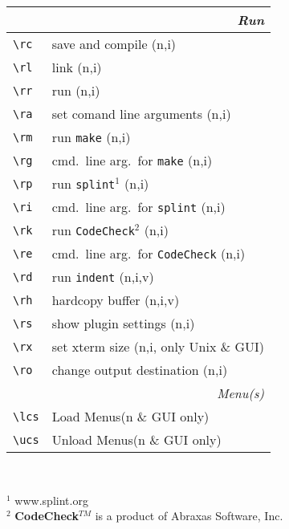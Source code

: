 \documentclass[oneside,10pt,landscape,DIV17]{scrartcl}
\begin{document}
\begin{multicols}{3}
\begin{center}
\begin{tabular}[]{|p{11mm}|p{58mm}|}
\hline 
\hline
\multicolumn{2}{|r|}{\textsl{\textbf{R}un}} \\
\hline \verb'\rc'  & save and compile                        \hfill (n,i)\\
\hline \verb'\rl'  & link                                    \hfill (n,i)\\
\hline \verb'\rr'  & run                                     \hfill (n,i)\\
\hline \verb'\ra'  & set comand line arguments               \hfill (n,i)\\
\hline \verb'\rm'  & run \texttt{make}                       \hfill (n,i)\\
\hline \verb'\rg'  & cmd.\ line arg.\ for \texttt{make}      \hfill (n,i)\\
%
\hline \verb'\rp'  & run \texttt{splint}$^1$     \hfill (n,i)\\
\hline \verb'\ri'  & cmd.\ line arg.\ for \texttt{splint}    \hfill (n,i)\\
%
\hline \verb'\rk'  & run \texttt{CodeCheck}$^2$  \hfill (n,i)\\
\hline \verb'\re'  & cmd.\ line arg.\ for \texttt{CodeCheck} \hfill (n,i)\\
%
\hline \verb'\rd'  & run \texttt{indent}         \hfill (n,i,v)\\
\hline \verb'\rh'  & hardcopy buffer             \hfill (n,i,v)\\
\hline \verb'\rs'  & show plugin settings        \hfill (n,i)\\
\hline \verb'\rx'  & set xterm size              \hfill (n,i, only Unix \& GUI)\\
\hline \verb'\ro'  & change output destination   \hfill (n,i)\\
\hline
%
\hline
\multicolumn{2}{|r|}{\textsl{Menu(s)}}\\
\hline \verb'\lcs'  & Load    Menus\hfill \scriptsize{(n \& GUI only)}\\
\hline \verb'\ucs'  & Unload  Menus\hfill \scriptsize{(n \& GUI only)}\\
\hline
\end{tabular} \\
\vspace{1mm}
\begin{minipage}[b]{69mm}
\footnotesize{%
$^1$ {www.splint.org}\\
$^2$ \textbf{CodeCheck}$^{TM}$ is a product of Abraxas Software, Inc.
}%
\end{minipage}%
%
\end{center}
\end{multicols}
\end{document}
